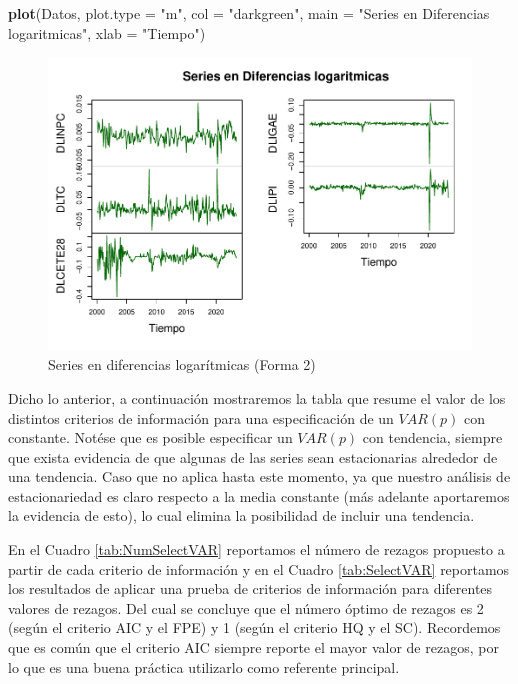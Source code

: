 \documentclass[
]{book}
\newenvironment{Shaded}{\begin{snugshade}}{\end{snugshade}}
\newcommand{\AttributeTok}[1]{\textcolor[rgb]{0.13,0.29,0.53}{#1}}
\newcommand{\FunctionTok}[1]{\textcolor[rgb]{0.13,0.29,0.53}{\textbf{#1}}}
\newcommand{\NormalTok}[1]{#1}
\newcommand{\StringTok}[1]{\textcolor[rgb]{0.31,0.60,0.02}{#1}}
\begin{document}
\begin{Shaded}
\begin{Highlighting}[]
\FunctionTok{plot}\NormalTok{(Datos, }\AttributeTok{plot.type =} \StringTok{"m"}\NormalTok{, }
     \AttributeTok{col =} \StringTok{"darkgreen"}\NormalTok{, }
     \AttributeTok{main =} \StringTok{"Series en Diferencias logaritmicas"}\NormalTok{, }\AttributeTok{xlab =} \StringTok{"Tiempo"}\NormalTok{)}
\end{Highlighting}
\end{Shaded}

\begin{figure}

{\centering \includegraphics{Notas-Series-Tiempo_files/figure-latex/fig63-1} 

}

\caption{Series en diferencias logarítmicas (Forma 2)}\label{fig:fig63}
\end{figure}

Dicho lo anterior, a continuación mostraremos la tabla que resume el
valor de los distintos criterios de información para una especificación
de un \(VAR(p)\) con constante. Notése que es posible especificar un
\(VAR(p)\) con tendencia, siempre que exista evidencia de que algunas de
las series sean estacionarias alrededor de una tendencia. Caso que no
aplica hasta este momento, ya que nuestro análisis de estacionariedad es
claro respecto a la media constante (más adelante aportaremos la
evidencia de esto), lo cual elimina la posibilidad de incluir una
tendencia.

En el Cuadro \ref{tab:NumSelectVAR} reportamos el número de rezagos
propuesto a partir de cada criterio de información y en el Cuadro
\ref{tab:SelectVAR} reportamos los resultados de aplicar una prueba de
criterios de información para diferentes valores de rezagos. Del cual se
concluye que el número óptimo de rezagos es 2 (según el criterio AIC y
el FPE) y 1 (según el criterio HQ y el SC). Recordemos que es común que
el criterio AIC siempre reporte el mayor valor de rezagos, por lo que es
una buena práctica utilizarlo como referente principal.
\end{document}
